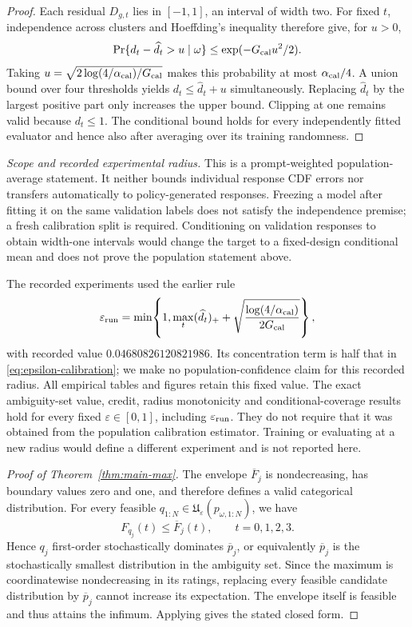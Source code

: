 \begin{proof}
Each residual \(D_{g,t}\) lies in \([-1,1]\), an interval of width two.
For fixed \(t\), independence across clusters and Hoeffding's inequality
\citep{hoeffding1963probability} therefore give, for \(u>0\),
\[
\Pr\{d_t-\widehat d_t>u\mid\omega\}
\le \exp(-G_{\rm cal}u^2/2).
\]
Taking \(u=\sqrt{2\log(4/\alpha_{\rm cal})/G_{\rm cal}}\) makes this
probability at most \(\alpha_{\rm cal}/4\). A union bound over four
thresholds yields \(d_t\le\widehat d_t+u\) simultaneously. Replacing
\(\widehat d_t\) by the largest positive part only increases the upper bound.
Clipping at one remains valid because \(d_t\le1\). The conditional bound
holds for every independently fitted evaluator and hence also after averaging
over its training randomness.
\end{proof}

\emph{Scope and recorded experimental radius.}
This is a prompt-weighted population-average statement. It neither bounds
individual response CDF errors nor transfers automatically to policy-generated
responses. Freezing a model after fitting it on the same validation labels does
not satisfy the independence premise; a fresh calibration split is required.
Conditioning on validation responses to obtain width-one intervals would change
the target to a fixed-design conditional mean and does not prove the population
statement above.

The recorded experiments used the earlier rule
\[
\varepsilon_{\rm run}=\min\!\left\{1,\max_t(\widehat d_t)_+
+\sqrt{\frac{\log(4/\alpha_{\rm cal})}{2G_{\rm cal}}}\right\},
\]
with recorded value \(0.04680826120821986\). Its concentration term is half
that in \cref{eq:epsilon-calibration}; we make no population-confidence claim
for this recorded radius. All empirical tables and figures retain this fixed
value. The exact ambiguity-set value, credit, radius monotonicity and
conditional-coverage results hold for every fixed \(\varepsilon\in[0,1]\),
including \(\varepsilon_{\rm run}\). They do not require that it was obtained
from the population calibration estimator. Training or evaluating at a new
radius would define a different experiment and is not reported here.

\begin{proof}[Proof of Theorem~\ref{thm:main-max}]
The envelope \(\overline F_j\) is nondecreasing, has boundary values zero and one, and therefore defines a valid categorical distribution. For every feasible \(q_{1:N}\in\mathfrak U_{\varepsilon}(p_{\omega,1:N})\), we have
\[
F_{q_j}(t) \le \overline F_j(t), \qquad t = 0,1,2,3.
\]
Hence \(q_j\) first-order stochastically dominates \(\overline p_j\), or equivalently \(\overline p_j\) is the stochastically smallest distribution in the ambiguity set. Since the maximum is coordinatewise nondecreasing in its ratings, replacing every feasible candidate distribution by \(\overline p_j\) cannot increase its expectation. The envelope itself is feasible and thus attains the infimum. Applying  gives the stated closed form.
\end{proof}

